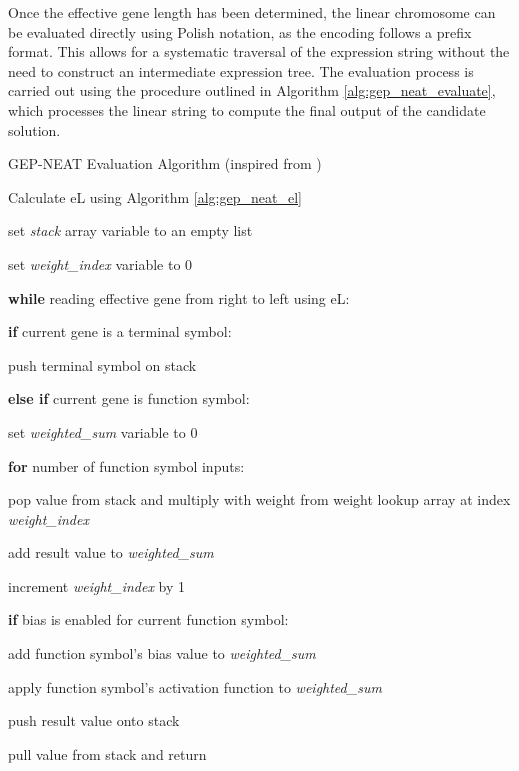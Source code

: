 \parbreak\noindent Once the effective gene length has been determined, the linear chromosome can be evaluated directly using Polish notation, as the encoding follows a prefix format. This allows for a systematic traversal of the expression string without the need to construct an intermediate expression tree. The evaluation process is carried out using the procedure outlined in Algorithm \ref{alg:gep_neat_evaluate}, which processes the linear string to compute the final output of the candidate solution.

\parbreak
\begin{algorithm}
	\caption{GEP-NEAT Evaluation Algorithm (inspired from \cite{peng2014improved})}\label{alg:gep_neat_evaluate}
	\begin{algorithmic}[1]
	\item Calculate eL using Algorithm \ref{alg:gep_neat_el}
	\item set \textit{stack} array variable to an empty list
	\item set \textit{weight\_index} variable to 0
	\item \textbf{while} reading effective gene from right to left using eL:
	\item \quad \textbf{if} current gene is a terminal symbol:
	\item \quad \quad push terminal symbol on stack
	\item \quad \textbf{else if} current gene is function symbol:
	\item \quad \quad set \textit{weighted\_sum} variable to 0
	\item \quad \quad \textbf{for} number of function symbol inputs:
	\item \quad \quad \quad pop value from stack and multiply with weight from weight lookup array at index \textit{weight\_index}
	\item \quad \quad \quad add result value to \textit{weighted\_sum}
	\item \quad \quad \quad increment \textit{weight\_index} by 1
	\item \quad \quad \textbf{if} bias is enabled for current function symbol:
	\item \quad \quad \quad add function symbol's bias value to \textit{weighted\_sum}
	\item \quad \quad apply function symbol's activation function to \textit{weighted\_sum}
	\item \quad \quad push result value onto stack
	\item pull value from stack and return
\end{algorithmic}
\end{algorithm}

